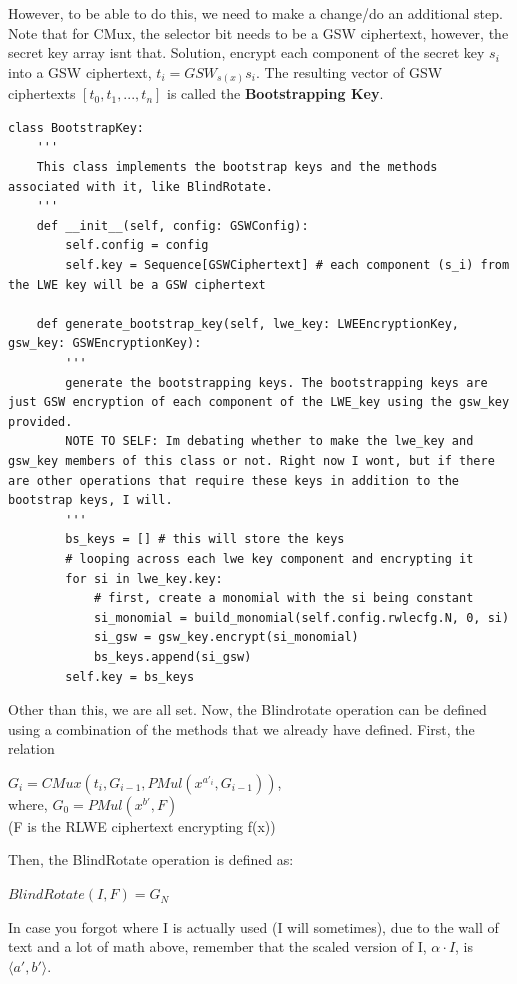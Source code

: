 \documentclass{report}
\begin{document}
However, to be able to do this, we need to make a change/do an additional step. Note that for CMux, the selector bit needs to be a GSW ciphertext, however, the secret key array isnt that. Solution, encrypt each component of the secret key $s_i$ into a GSW ciphertext, $t_i = GSW_{s(x)} s_i$. The resulting vector of GSW ciphertexts $[t_0, t_1, ..., t_n]$ is called the \textbf{Bootstrapping Key}. 
\begin{verbatim}
class BootstrapKey:
	'''
	This class implements the bootstrap keys and the methods associated with it, like BlindRotate.
	'''
	def __init__(self, config: GSWConfig):
		self.config = config
		self.key = Sequence[GSWCiphertext] # each component (s_i) from the LWE key will be a GSW ciphertext
	
	def generate_bootstrap_key(self, lwe_key: LWEEncryptionKey, gsw_key: GSWEncryptionKey):
		'''
		generate the bootstrapping keys. The bootstrapping keys are just GSW encryption of each component of the LWE_key using the gsw_key provided.
		NOTE TO SELF: Im debating whether to make the lwe_key and gsw_key members of this class or not. Right now I wont, but if there are other operations that require these keys in addition to the bootstrap keys, I will.
		'''
		bs_keys = [] # this will store the keys
		# looping across each lwe key component and encrypting it
		for si in lwe_key.key:
			# first, create a monomial with the si being constant
			si_monomial = build_monomial(self.config.rwlecfg.N, 0, si)
			si_gsw = gsw_key.encrypt(si_monomial)
			bs_keys.append(si_gsw)
		self.key = bs_keys
\end{verbatim}

Other than this, we are all set. Now, the Blindrotate operation can be defined using a combination of the methods that we already have defined. First, the relation
\begin{center}
	$G_i = CMux(t_i, G_{i-1}, PMul(x^{a'_i}, G_{i-1}))$, \\
	where, $G_0 = PMul(x^{b'}, F)$ \\(F is the RLWE ciphertext encrypting f(x))
\end{center}
Then, the BlindRotate operation is defined as: 
\begin{center}
	$BlindRotate(I, F) = G_N$
\end{center}
In case you forgot where I is actually used (I will sometimes), due to the wall of text and a lot of math above, remember that the scaled version of I, $\alpha \cdot I$,  is $\langle a', b' \rangle$.
\end{document}
